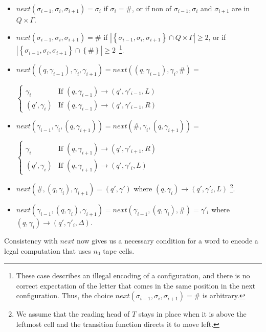 \documentclass[10pt,a4paper]{amsart}
\theoremstyle{definition}
\numberwithin{equation}{section}
\newcommand{\set}[1]{\{ #1 \}}
\renewcommand{\set}[1]{\left\{ #1 \right\}}
\begin{document}
\begin{itemize}
\item $next(\sigma_{i-1},\sigma_i,\sigma_{i+1})=\sigma_i$ if $\sigma_i=\#$, or if non of $\sigma_{i-1},\sigma_i$ and $\sigma_{i+1}$ are in $Q\times\Gamma$.
\item $next(\sigma_{i-1},\sigma_i,\sigma_{i+1})=\#$ if $|\set{\sigma_{i-1},\sigma_i,\sigma_{i+1}}\cap Q\times \Gamma|\geq 2$, or if $|\set{\sigma_{i-1},\sigma_i,\sigma_{i+1}}\cap \set{\#}|\geq 2$~\footnote{These case describes an illegal encoding of a configuration, and there is no correct expectation of the letter that comes in the same position in the next configuration. Thus, the choice $next(\sigma_{i-1},\sigma_i,\sigma_{i+1})=\#$ is arbitrary.}.
\item
$next((q,\gamma_{i-1}),\gamma_i,\gamma_{i+1})=
next((q,\gamma_{i-1}),\gamma_i,\#)=$
\begin{center}
$\left\{
\begin{array}{ll}
\gamma_i & \mbox{If $(q,\gamma_{i-1}) \rightarrow
(q',\gamma'_{i-1},L)$}\\
(q',\gamma_i) & \mbox{If $(q,\gamma_{i-1}) \rightarrow
(q',\gamma'_{i-1},R)$}
\end{array}
\right.$
\end{center}
\item
$next(\gamma_{i-1},\gamma_i,(q,\gamma_{i+1}))=
next(\#,\gamma_i,(q,\gamma_{i+1}))=$
\begin{center}
	$\left\{
	\begin{array}{ll}
		\gamma_i & \mbox{If $(q,\gamma_{i+1}) \rightarrow
			(q',\gamma'_{i+1},R)$}\\
		(q',\gamma_i) & \mbox{If $(q,\gamma_{i+1}) \rightarrow
			(q',\gamma'_{i},L)$}
	\end{array}
	\right.$
\end{center}
\item 
$next(\#,(q,\gamma_{i}),\gamma_{i+1})=(q',\gamma')$ where $(q,\gamma_{i}) \rightarrow (q',\gamma'_{i},L)$
\footnote{
	We assume that the reading head of $T$ stays in place when it is above the leftmost cell and the transition function directs it to move left.}.
\item
$next(\gamma_{i-1},(q,\gamma_{i}),\gamma_{i+1})=
next(\gamma_{i-1},(q,\gamma_{i}),\#)=
\gamma'_i$ where $(q,\gamma_{i}) \rightarrow (q',\gamma'_{i},\Delta)$.
\end{itemize}

\noindent
Consistency with $next$ now gives us a necessary condition for a word
to encode a legal computation that uses $n_0$ tape cells.  
\end{document}
